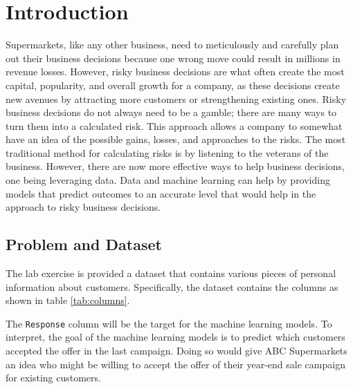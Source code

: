 \section{Introduction}


Supermarkets, like any other business, need to meticulously and carefully plan out their business decisions because one wrong move could result in millions in revenue losses. However, risky business decisions are what often create the most capital, popularity, and overall growth for a company, as these decisions create new avenues by attracting more customers or strengthening existing ones. Risky business decisions do not always need to be a gamble; there are many ways to turn them into a calculated risk. This approach allows a company to somewhat have an idea of the possible gains, losses, and approaches to the risks. The most traditional method for calculating risks is by listening to the veterans of the business. However, there are now more effective ways to help business decisions, one being leveraging data. Data and machine learning can help by providing models that predict outcomes to an accurate level that would help in the approach to risky business decisions. 

\subsection{Problem and Dataset}

The lab exercise is provided a dataset that contains various pieces of personal information about customers. Specifically, the dataset contains the columns as shown in table \ref{tab:columns}.

The \texttt{Response} column will be the target for the machine learning models. To interpret, the goal of the machine learning models is to predict which customers accepted the offer in the last campaign. Doing so would give ABC Supermarkets an idea who might be willing to accept the offer of their year-end sale campaign for existing customers. 

